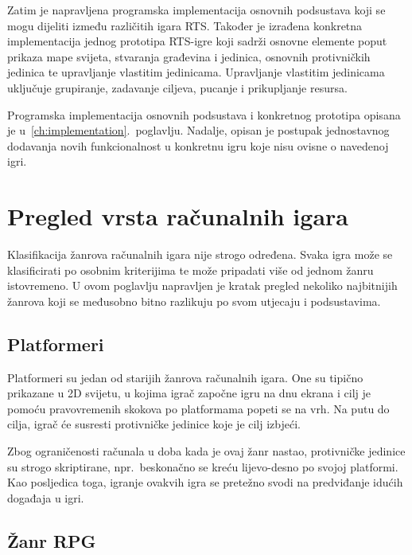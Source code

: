 \documentclass[times, utf8, zavrsni, numeric]{fer}
\begin{document}
\par Zatim je napravljena programska implementacija osnovnih podsustava koji se mogu dijeliti između različitih igara RTS.
Također je izrađena konkretna implementacija jednog prototipa RTS-igre koji sadrži osnovne elemente poput prikaza mape svijeta, stvaranja građevina i jedinica, osnovnih protivničkih jedinica te upravljanje vlastitim jedinicama.
Upravljanje vlastitim jedinicama uključuje grupiranje, zadavanje ciljeva, pucanje i prikupljanje resursa.

\par Programska implementacija osnovnih podsustava i konkretnog prototipa opisana je u~\ref{ch:implementation}.~poglavlju.
Nadalje, opisan je postupak jednostavnog dodavanja novih funkcionalnost u konkretnu igru koje nisu ovisne o navedenoj igri.

\chapter{Pregled vrsta računalnih igara}\label{ch:games}

\par Klasifikacija žanrova računalnih igara nije strogo određena.
Svaka igra može se klasificirati po osobnim kriterijima te može pripadati više od jednom žanru istovremeno.
U ovom poglavlju napravljen je kratak pregled nekoliko najbitnijih žanrova koji se međusobno bitno razlikuju po svom utjecaju i podsustavima.

\section{Platformeri}

\par Platformeri su jedan od starijih žanrova računalnih igara.
One su tipično prikazane u 2D svijetu, u kojima igrač započne igru na dnu ekrana i cilj je pomoću pravovremenih skokova po platformama popeti se na vrh.
Na putu do cilja, igrač će susresti protivničke jedinice koje je cilj izbjeći.

\par Zbog ograničenosti računala u doba kada je ovaj žanr nastao, protivničke jedinice su strogo skriptirane, npr.\ beskonačno se kreću lijevo-desno po svojoj platformi.
Kao posljedica toga, igranje ovakvih igra se pretežno svodi na predviđanje idućih događaja u igri.

\section{Žanr RPG}
\end{document}
